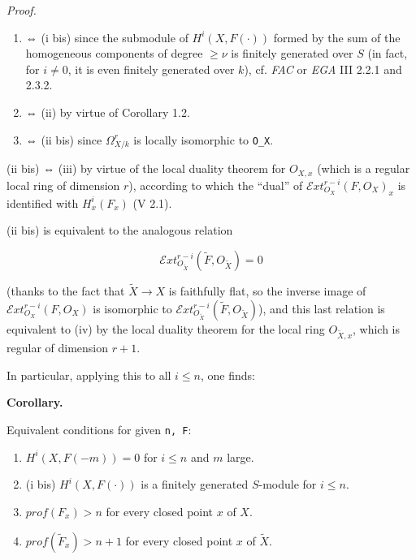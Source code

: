 \documentclass[
]{article}
\providecommand{\tightlist}{%
  \setlength{\itemsep}{0pt}\setlength{\parskip}{0pt}}
\begin{document}
\emph{Proof.}

\begin{enumerate}
\def\labelenumi{(\roman{enumi})}
\item
  ⇔ (i bis) since the submodule of \(H^{i}(X, F(\cdot))\) formed by the
  sum of the homogeneous components of degree \(\geqslant \nu\) is
  finitely generated over \(S\) (in fact, for \(i \neq 0\), it is even
  finitely generated over \(k\)), cf. \emph{FAC} or \emph{EGA} III 2.2.1
  and 2.3.2.
\item
  ⇔ (ii) by virtue of Corollary 1.2.
\item
  ⇔ (ii bis) since \(\Omega^{r}_{X/k}\) is locally isomorphic to
  \texttt{O\_X}.
\end{enumerate}

(ii bis) ⇔ (iii) by virtue of the local duality theorem for \(O_{X,x}\)
(which is a regular local ring of dimension \(r\)), according to which
the ``dual'' of \(\mathcal{E}xt^{r-i}_{O_{X}}(F, O_{X})_{x}\) is
identified with \(H^{i}_{x}(F_{x})\) (V 2.1).

(ii bis) is equivalent to the analogous relation

\[
\mathcal{E}xt^{r-i}_{O_{\tilde{X}}}(\tilde{F}, O_{\tilde{X}}) = 0
\]

(thanks to the fact that \(\tilde{X} \to X\) is faithfully flat, so the
inverse image of \(\mathcal{E}xt^{r-i}_{O_{X}}(F, O_{X})\) is isomorphic
to \(\mathcal{E}xt^{r-i}_{O_{\tilde{X}}}(\tilde{F}, O_{\tilde{X}})\)),
and this last relation is equivalent to (iv) by the local duality
theorem for the local ring \(O_{\tilde{X},x}\), which is regular of
dimension \(r + 1\).

In particular, applying this to all \(i \leqslant n\), one finds:

\textbf{Corollary.}

Equivalent conditions for given \texttt{n,\ F}:

\begin{enumerate}
\def\labelenumi{\arabic{enumi}.}
\tightlist
\item
  \(H^{i}(X, F(-m)) = 0\) for \(i \leqslant n\) and \(m\) large.
\item
  (i bis) \(H^{i}(X, F(\cdot))\) is a finitely generated \(S\)-module
  for \(i \leqslant n\).
\item
  \(prof(F_{x}) > n\) for every closed point \(x\) of \(X\).
\item
  \(prof(\tilde{F}_{x}) > n + 1\) for every closed point \(x\) of
  \(\tilde{X}\).
\end{enumerate}
\end{document}
